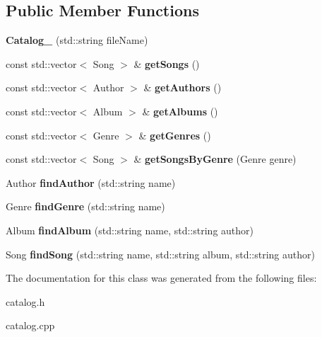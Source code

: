 \subsection*{Public Member Functions}
\begin{DoxyCompactItemize}
\item 
{\bfseries Catalog\+\_\+} (std\+::string file\+Name)\hypertarget{class_catalog___abb39c516b154a11444e1f19afa33bf4e}{}\label{class_catalog___abb39c516b154a11444e1f19afa33bf4e}

\item 
const std\+::vector$<$ Song $>$ \& {\bfseries get\+Songs} ()\hypertarget{class_catalog___a5b4b4d737d7b02c1278c3e3286b7afd5}{}\label{class_catalog___a5b4b4d737d7b02c1278c3e3286b7afd5}

\item 
const std\+::vector$<$ Author $>$ \& {\bfseries get\+Authors} ()\hypertarget{class_catalog___af964934557300f1adc6558e112cc31fa}{}\label{class_catalog___af964934557300f1adc6558e112cc31fa}

\item 
const std\+::vector$<$ Album $>$ \& {\bfseries get\+Albums} ()\hypertarget{class_catalog___a0eba1e6b2ba562cd41e7360af16c2ef5}{}\label{class_catalog___a0eba1e6b2ba562cd41e7360af16c2ef5}

\item 
const std\+::vector$<$ Genre $>$ \& {\bfseries get\+Genres} ()\hypertarget{class_catalog___af8117e2c7d5ddc9d49c4ac707533d565}{}\label{class_catalog___af8117e2c7d5ddc9d49c4ac707533d565}

\item 
const std\+::vector$<$ Song $>$ \& {\bfseries get\+Songs\+By\+Genre} (Genre genre)\hypertarget{class_catalog___aba29098b0061c8d7b83cbe582b6861bf}{}\label{class_catalog___aba29098b0061c8d7b83cbe582b6861bf}

\item 
Author {\bfseries find\+Author} (std\+::string name)\hypertarget{class_catalog___a807b5dc84a686e893a40ebe70b6d6e19}{}\label{class_catalog___a807b5dc84a686e893a40ebe70b6d6e19}

\item 
Genre {\bfseries find\+Genre} (std\+::string name)\hypertarget{class_catalog___a0fee0f49821e1b52cd6c6e737a3f6e6f}{}\label{class_catalog___a0fee0f49821e1b52cd6c6e737a3f6e6f}

\item 
Album {\bfseries find\+Album} (std\+::string name, std\+::string author)\hypertarget{class_catalog___a11d75c63d4fd73a40d3ecd9e88913b72}{}\label{class_catalog___a11d75c63d4fd73a40d3ecd9e88913b72}

\item 
Song {\bfseries find\+Song} (std\+::string name, std\+::string album, std\+::string author)\hypertarget{class_catalog___a4c0fa02c603a172ae2853fd3c7377988}{}\label{class_catalog___a4c0fa02c603a172ae2853fd3c7377988}

\end{DoxyCompactItemize}


The documentation for this class was generated from the following files\+:\begin{DoxyCompactItemize}
\item 
catalog.\+h\item 
catalog.\+cpp\end{DoxyCompactItemize}
